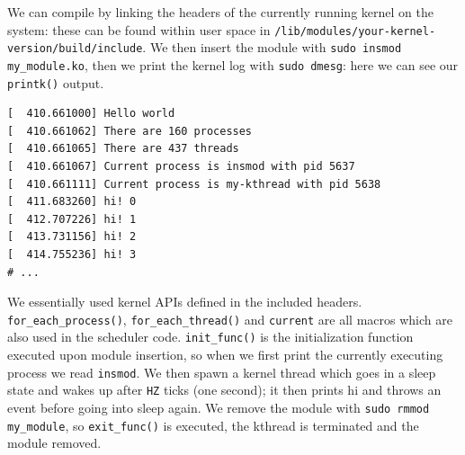 \documentclass[10pt, oneside]{book}
\begin{document}
We can compile by linking the headers of the currently running kernel on the system: these can be found within user space in \verb|/lib/modules/your-kernel-version/build/include|. We then insert the module with \verb|sudo insmod my_module.ko|, then we print the kernel log with \verb|sudo dmesg|: here we can see our \verb|printk()| output.
\begin{Verbatim}
[  410.661000] Hello world
[  410.661062] There are 160 processes
[  410.661065] There are 437 threads
[  410.661067] Current process is insmod with pid 5637
[  410.661111] Current process is my-kthread with pid 5638
[  411.683260] hi! 0
[  412.707226] hi! 1
[  413.731156] hi! 2
[  414.755236] hi! 3
# ...
\end{Verbatim}
We essentially used kernel APIs defined in the included headers. \verb|for_each_process()|, \verb|for_each_thread()| and \verb|current| are all macros which are also used in the scheduler code. \verb|init_func()| is the initialization function executed upon module insertion, so when we first print the currently executing process we read \verb|insmod|. We then spawn a kernel thread which goes in a sleep state and wakes up after \verb|HZ| ticks (one second); it then prints hi and throws an event before going into sleep again. We remove the module with \verb|sudo rmmod my_module|, so \verb|exit_func()| is executed, the kthread is terminated and the module removed.
\end{document}
